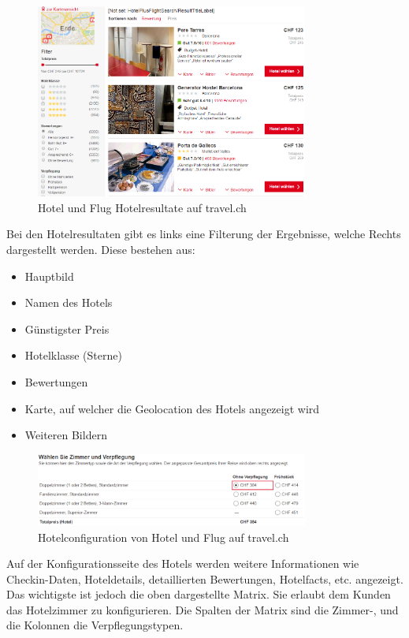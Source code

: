 \begin{figure}[H]
	\centering
	\includegraphics[width=0.8\textwidth]{images/travel-results.png}
	\caption{Hotel und Flug Hotelresultate auf travel.ch}
	\label{fig:recherche:travelch:results}
\end{figure}
Bei den Hotelresultaten gibt es links eine Filterung der Ergebnisse, welche Rechts dargestellt werden. Diese bestehen aus:
\begin{itemize}
\item Hauptbild
\item Namen des Hotels
\item Günstigster Preis
\item Hotelklasse (Sterne)
\item Bewertungen
\item Karte, auf welcher die Geolocation des Hotels angezeigt wird
\item Weiteren Bildern
\end{itemize}

\begin{figure}[H]
	\centering
	\includegraphics[width=0.8\textwidth]{images/travel-configuration.png}
	\caption{Hotelconfiguration von Hotel und Flug auf travel.ch}
	\label{fig:recherche:travelch:configuration}
\end{figure}
Auf der Konfigurationsseite des Hotels werden weitere Informationen wie Checkin-Daten, Hoteldetails, detaillierten Bewertungen, Hotelfacts, etc. angezeigt. Das wichtigste ist jedoch die oben dargestellte Matrix. Sie erlaubt dem Kunden das Hotelzimmer zu konfigurieren. Die Spalten der Matrix sind die Zimmer-, und die Kolonnen die Verpflegungstypen.

